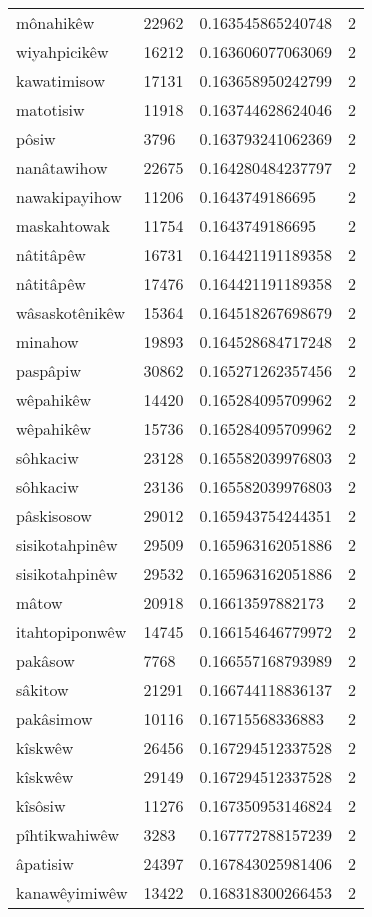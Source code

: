 \begin{longtable}{llll}
mônahikêw & 22962 & 0.163545865240748 & 2 \\
wiyahpicikêw & 16212 & 0.163606077063069 & 2 \\
kawatimisow & 17131 & 0.163658950242799 & 2 \\
matotisiw & 11918 & 0.163744628624046 & 2 \\
pôsiw & 3796 & 0.163793241062369 & 2 \\
nanâtawihow & 22675 & 0.164280484237797 & 2 \\
nawakipayihow & 11206 & 0.1643749186695 & 2 \\
maskahtowak & 11754 & 0.1643749186695 & 2 \\
nâtitâpêw & 16731 & 0.164421191189358 & 2 \\
nâtitâpêw & 17476 & 0.164421191189358 & 2 \\
wâsaskotênikêw & 15364 & 0.164518267698679 & 2 \\
minahow & 19893 & 0.164528684717248 & 2 \\
paspâpiw & 30862 & 0.165271262357456 & 2 \\
wêpahikêw & 14420 & 0.165284095709962 & 2 \\
wêpahikêw & 15736 & 0.165284095709962 & 2 \\
sôhkaciw & 23128 & 0.165582039976803 & 2 \\
sôhkaciw & 23136 & 0.165582039976803 & 2 \\
pâskisosow & 29012 & 0.165943754244351 & 2 \\
sisikotahpinêw & 29509 & 0.165963162051886 & 2 \\
sisikotahpinêw & 29532 & 0.165963162051886 & 2 \\
mâtow & 20918 & 0.16613597882173 & 2 \\
itahtopiponwêw & 14745 & 0.166154646779972 & 2 \\
pakâsow & 7768 & 0.166557168793989 & 2 \\
sâkitow & 21291 & 0.166744118836137 & 2 \\
pakâsimow & 10116 & 0.16715568336883 & 2 \\
kîskwêw & 26456 & 0.167294512337528 & 2 \\
kîskwêw & 29149 & 0.167294512337528 & 2 \\
kîsôsiw & 11276 & 0.167350953146824 & 2 \\
pîhtikwahiwêw & 3283 & 0.167772788157239 & 2 \\
âpatisiw & 24397 & 0.167843025981406 & 2 \\
kanawêyimiwêw & 13422 & 0.168318300266453 & 2 \\

\end{longtable}
